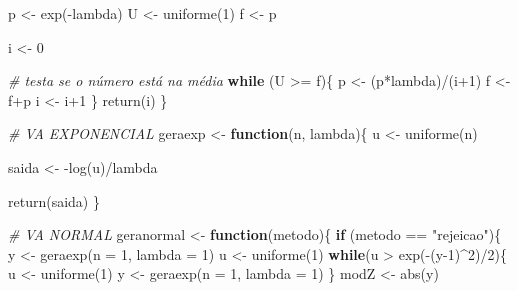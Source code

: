 \documentclass[
]{article}
\newenvironment{Shaded}{\begin{snugshade}}{\end{snugshade}}
\newcommand{\AttributeTok}[1]{\textcolor[rgb]{0.77,0.63,0.00}{#1}}
\newcommand{\CommentTok}[1]{\textcolor[rgb]{0.56,0.35,0.01}{\textit{#1}}}
\newcommand{\ControlFlowTok}[1]{\textcolor[rgb]{0.13,0.29,0.53}{\textbf{#1}}}
\newcommand{\DecValTok}[1]{\textcolor[rgb]{0.00,0.00,0.81}{#1}}
\newcommand{\FunctionTok}[1]{\textcolor[rgb]{0.00,0.00,0.00}{#1}}
\newcommand{\NormalTok}[1]{#1}
\newcommand{\OtherTok}[1]{\textcolor[rgb]{0.56,0.35,0.01}{#1}}
\newcommand{\SpecialCharTok}[1]{\textcolor[rgb]{0.00,0.00,0.00}{#1}}
\newcommand{\StringTok}[1]{\textcolor[rgb]{0.31,0.60,0.02}{#1}}
\begin{document}
\begin{Shaded}
\begin{Highlighting}[]
\NormalTok{  p }\OtherTok{\textless{}{-}} \FunctionTok{exp}\NormalTok{(}\SpecialCharTok{{-}}\NormalTok{lambda)}
\NormalTok{  U }\OtherTok{\textless{}{-}} \FunctionTok{uniforme}\NormalTok{(}\DecValTok{1}\NormalTok{)}
\NormalTok{  f }\OtherTok{\textless{}{-}}\NormalTok{ p}
  
\NormalTok{  i }\OtherTok{\textless{}{-}} \DecValTok{0}
  
  \CommentTok{\# testa se o número está na média}
    \ControlFlowTok{while}\NormalTok{ (U }\SpecialCharTok{\textgreater{}=}\NormalTok{ f)\{}
\NormalTok{      p }\OtherTok{\textless{}{-}}\NormalTok{ (p}\SpecialCharTok{*}\NormalTok{lambda)}\SpecialCharTok{/}\NormalTok{(i}\SpecialCharTok{+}\DecValTok{1}\NormalTok{)}
\NormalTok{      f }\OtherTok{\textless{}{-}}\NormalTok{ f}\SpecialCharTok{+}\NormalTok{p}
\NormalTok{      i }\OtherTok{\textless{}{-}}\NormalTok{ i}\SpecialCharTok{+}\DecValTok{1}
\NormalTok{    \}}
    \FunctionTok{return}\NormalTok{(i)}
\NormalTok{\}}

\CommentTok{\# VA EXPONENCIAL}
\NormalTok{geraexp }\OtherTok{\textless{}{-}} \ControlFlowTok{function}\NormalTok{(n, lambda)\{}
\NormalTok{  u }\OtherTok{\textless{}{-}} \FunctionTok{uniforme}\NormalTok{(n)}
  
\NormalTok{  saida }\OtherTok{\textless{}{-}} \SpecialCharTok{{-}}\FunctionTok{log}\NormalTok{(u)}\SpecialCharTok{/}\NormalTok{lambda}
  
  \FunctionTok{return}\NormalTok{(saida)}
\NormalTok{\}}

\CommentTok{\# VA NORMAL}
\NormalTok{geranormal }\OtherTok{\textless{}{-}} \ControlFlowTok{function}\NormalTok{(metodo)\{}
  \ControlFlowTok{if}\NormalTok{ (metodo }\SpecialCharTok{==} \StringTok{"rejeicao"}\NormalTok{)\{}
\NormalTok{    y }\OtherTok{\textless{}{-}} \FunctionTok{geraexp}\NormalTok{(}\AttributeTok{n =} \DecValTok{1}\NormalTok{, }\AttributeTok{lambda =} \DecValTok{1}\NormalTok{)}
\NormalTok{    u }\OtherTok{\textless{}{-}} \FunctionTok{uniforme}\NormalTok{(}\DecValTok{1}\NormalTok{)}
    \ControlFlowTok{while}\NormalTok{(u }\SpecialCharTok{\textgreater{}} \FunctionTok{exp}\NormalTok{(}\SpecialCharTok{{-}}\NormalTok{(y}\DecValTok{{-}1}\NormalTok{)}\SpecialCharTok{\^{}}\DecValTok{2}\NormalTok{)}\SpecialCharTok{/}\DecValTok{2}\NormalTok{)\{}
\NormalTok{      u }\OtherTok{\textless{}{-}} \FunctionTok{uniforme}\NormalTok{(}\DecValTok{1}\NormalTok{)}
\NormalTok{      y }\OtherTok{\textless{}{-}} \FunctionTok{geraexp}\NormalTok{(}\AttributeTok{n =} \DecValTok{1}\NormalTok{, }\AttributeTok{lambda =} \DecValTok{1}\NormalTok{)}
\NormalTok{    \}}
\NormalTok{    modZ }\OtherTok{\textless{}{-}} \FunctionTok{abs}\NormalTok{(y)}
    

\end{Highlighting}
\end{Shaded}
\end{document}
